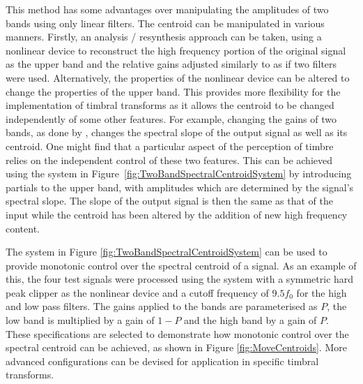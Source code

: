 			This method has some advantages over manipulating the amplitudes of two bands using only linear
			filters. The centroid can be manipulated in various manners. Firstly, an analysis / resynthesis
			approach can be taken, using a nonlinear device to reconstruct the high frequency portion of the
			original signal as the upper band and the relative gains adjusted similarly to as if two filters
			were used.  Alternatively, the properties of the nonlinear device can be altered to change the
			properties of the upper band. This provides more flexibility for the implementation of timbral
			transforms as it allows the centroid to be changed independently of some other features. For
			example, changing the gains of two bands, as done by \citet{zacharakis2011an}, changes the spectral
			slope of the output signal as well as its centroid. One might find that a particular aspect of the
			perception of timbre relies on the independent control of these two features. This can be achieved
			using the system in Figure~\ref{fig:TwoBandSpectralCentroidSystem} by introducing partials to the
			upper band, with amplitudes which are determined by the signal's spectral slope. The slope of the
			output signal is then the same as that of the input while the centroid has been altered by the
			addition of new high frequency content.

			The system in Figure \ref{fig:TwoBandSpectralCentroidSystem} can be used to provide monotonic
			control over the spectral centroid of a signal. As an example of this, the four test signals were
			processed using the system with a symmetric hard peak clipper as the nonlinear device and a cutoff
			frequency of $9.5f_{0}$ for the high and low pass filters. The gains applied to the bands are
			parameterised as $P$, the low band is multiplied by a gain of $1 - P$ and the high band by a gain
			of $P$. These specifications are selected to demonstrate how monotonic control over the spectral
			centroid can be achieved, as shown in Figure \ref{fig:MoveCentroids}. More advanced configurations
			can be devised for application in specific timbral transforms.

